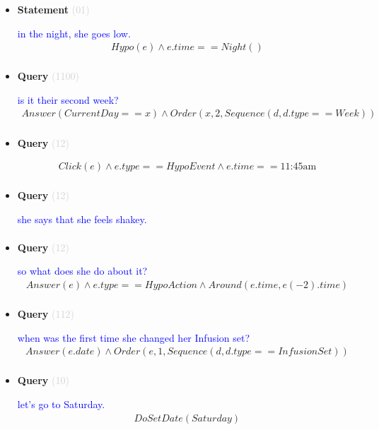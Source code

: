 \documentclass[11pt]{article}
\newcommand{\key}[1]{\textcolor{lightgray}{#1}}
\newcounter{CQuery}
\newcounter{CStatement}
\begin{document}
\begin{itemize}
\item
\textbf{Statement\theCStatement} \key{(01)} \addtocounter{CStatement}{1}
\textcolor{blue}{ in the night, she goes low. }
\begin{multline*}
Hypo(e) \wedge e.time==Night() \\ 
\end{multline*}


\item
\textbf{Query\theCQuery} \key{(1100)} \addtocounter{CQuery}{1}
\textcolor{blue}{ is it their second week? }
\begin{multline*}
Answer(CurrentDay==x) \wedge Order(x, 2, Sequence(d, d.type==Week)) \\ 
\end{multline*}


\item
\textbf{Query\theCQuery} \key{(12)} \addtocounter{CQuery}{1}
\textcolor{blue}{  }
\begin{multline*}
Click(e) \wedge e.type == HypoEvent \wedge e.time == \mbox{11:45am} \\ 
\end{multline*}


\item
\textbf{Query\theCQuery} \key{(12)} \addtocounter{CQuery}{1}
\textcolor{blue}{ she says that she feels shakey. }
\begin{multline*}
\end{multline*}


\item
\textbf{Query\theCQuery} \key{(12)} \addtocounter{CQuery}{1}
\textcolor{blue}{ so what does she do about it? }
\begin{multline*}
Answer(e) \wedge e.type == HypoAction \wedge Around(e.time, e(-2).time) \\ 
\end{multline*}


\item
\textbf{Query\theCQuery} \key{(112)} \addtocounter{CQuery}{1}
\textcolor{blue}{ when was the first time she changed her Infusion set? }
\begin{multline*}
Answer(e.date) \wedge Order(e, 1, Sequence(d, d.type==InfusionSet)) \\ 
\end{multline*}


\item
\textbf{Query\theCQuery} \key{(10)} \addtocounter{CQuery}{1}
\textcolor{blue}{ let's go to Saturday. }
\begin{multline*}
DoSetDate(Saturday) \\ 
\end{multline*}



\end{itemize}
\end{document}
